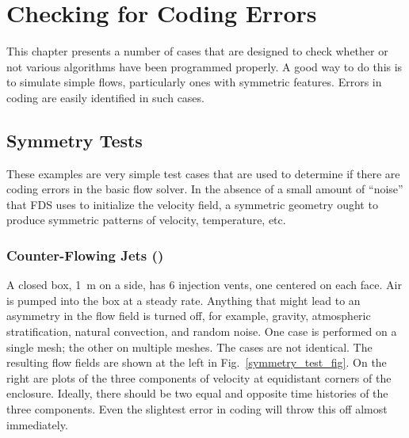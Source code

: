 \documentclass[11pt]{book}
\begin{document}
\chapter{Checking for Coding Errors}

This chapter presents a number of cases that are designed to check whether or not various algorithms have been programmed properly. A good way to do this is to simulate simple flows, particularly ones with symmetric features. Errors in coding are easily identified in such cases.

\section{Symmetry Tests}

These examples are very simple test cases that are used to determine if there are coding errors in the basic flow solver. In the absence of a small amount of ``noise'' that FDS uses to initialize the velocity field, a symmetric geometry ought to produce symmetric patterns of velocity, temperature, etc.

\subsection{Counter-Flowing Jets (\texorpdfstring{}{symmetry\_test})}
\label{symmetry_test}
\label{symmetry_test_mpi}

A closed box, 1~m on a side, has 6 injection vents, one centered on each face. Air is pumped into the box at a steady rate. Anything that might lead to an asymmetry in the flow field is turned off, for example, gravity, atmospheric stratification, natural convection, and random noise. One case is performed on a single mesh; the other on multiple meshes. The cases are not identical. The resulting flow fields are shown at the left in Fig.~\ref{symmetry_test_fig}. On the right are plots of the three components of velocity at equidistant corners of the enclosure. Ideally, there should be two equal and opposite time histories of the three components. Even the slightest error in coding will throw this off almost immediately.
\end{document}
